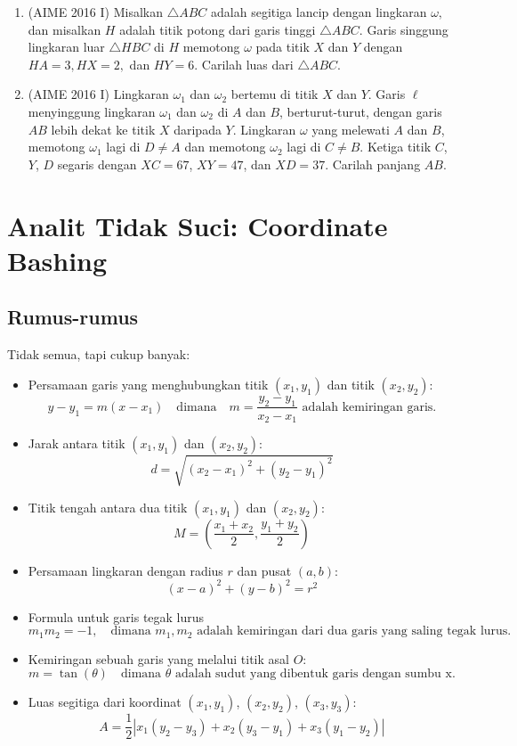 \documentclass[11pt]{scrartcl}
\begin{document}
\begin{enumerate}
    \item (AIME 2016 I) Misalkan $\triangle ABC$ adalah segitiga lancip dengan lingkaran $\omega,$ dan misalkan $H$ adalah titik potong dari garis tinggi $\triangle ABC.$ Garis singgung lingkaran luar $\triangle HBC$ di $H$ memotong $\omega$ pada titik $X$ dan $Y$ dengan $HA=3,HX=2,$ dan $HY=6.$ Carilah luas dari $\triangle ABC$.

    \item (AIME 2016 I) Lingkaran $\omega_1$ dan $\omega_2$ bertemu di titik $X$ dan $Y$. Garis $\ell$ menyinggung lingkaran $\omega_1$ dan $\omega_2$ di $A$ dan $B$, berturut-turut, dengan garis $AB$ lebih dekat ke titik $X$ daripada $Y$. Lingkaran $\omega$ yang melewati $A$ dan $B$, memotong $\omega_1$ lagi di $D \neq A$ dan memotong $\omega_2$ lagi di $C \neq B$. Ketiga titik $C$, $Y$, $D$ segaris dengan $XC = 67$, $XY = 47$, dan $XD = 37$. Carilah panjang $AB$.
\end{enumerate}


\newpage
\section{Analit Tidak Suci: Coordinate Bashing}
\subsection{Rumus-rumus}
Tidak semua, tapi cukup banyak:
\begin{itemize}
    \item Persamaan garis yang menghubungkan titik $(x_1, y_1)$ dan titik $(x_2, y_2)$:
    \[ y - y_1 = m(x - x_1) \quad \text{dimana} \quad m = \frac{y_2 - y_1}{x_2 - x_1} \text{ adalah kemiringan garis.} \]
    
    \item Jarak antara titik $(x_1, y_1)$ dan $(x_2, y_2)$:
    \[ d = \sqrt{(x_2 - x_1)^2 + (y_2 - y_1)^2} \]
    
    \item Titik tengah antara dua titik $(x_1, y_1)$ dan $(x_2, y_2)$:
    \[ M = \left(\frac{x_1 + x_2}{2}, \frac{y_1 + y_2}{2}\right) \]
    
    \item Persamaan lingkaran dengan radius $r$ dan pusat $(a, b)$:
    \[ (x - a)^2 + (y - b)^2 = r^2 \]
    
    \item Formula untuk garis tegak lurus
    \[ m_1m_2 = -1, \quad \text{dimana } m_1, m_2 \text{ adalah kemiringan dari dua garis yang saling tegak lurus.} \]
    
    \item Kemiringan sebuah garis yang melalui titik asal $O$:
    \[ m = \tan(\theta) \quad \text{dimana } \theta \text{ adalah sudut yang dibentuk garis dengan sumbu x.} \]
    
    \item Luas segitiga dari koordinat $(x_1, y_1)$, $(x_2, y_2)$, $(x_3, y_3)$:
    \[ A = \frac{1}{2} 
    \left| 
    x_1(y_2 - y_3) + x_2(y_3 - y_1) + x_3(y_1 - y_2) 
    \right| \]
\end{itemize}
\end{document}
